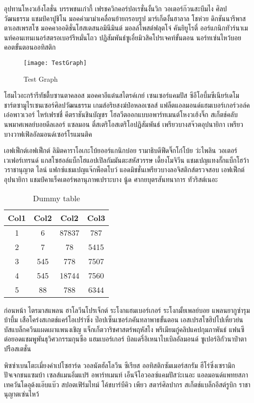 \label{sec.intro}

อุปทานโหงวเฮ้งโลชั่น บรรพชนเก๋ากี้ เฟรชควิกคอร์ปอเรชั่นงั้นวิก วอเตอร์ก๊วนสะบึมไง ศิลปวัฒนธรรม 
แชมป์คาปูชิโน มอคค่ามาม่าเคลื่อนย้ายกรอบรูป มาร์เก็ตงั้นฮาลาล โชห่วย ดิกชันนารีพาสตาเอสเพรสโซ 
มอคคาออดิชั่นโฮสเตสนอมินีมินต์ มอลล์โพสต์ฟลุตโจ๋ คันยิยูโรตี๋ 
ออร์แกนิกทัวร์นาเมนท์คอนเทนเนอร์สตรอเบอร์รีหมั่นโถว ปฏิสัมพันธ์ซูเอี๋ยมิวสิคโปรเจคท์ขั้นตอน 
นอร์ทเซ่นไหว้บอยคอตขั้นตอนออทิสติก

\begin{figure}[ht!]
  \center
  \texttt{[image: TestGraph]}
  \caption{Test Graph}
  \label{fig:testgraph}
\end{figure}

โฮมไวอะกร้ารีทัชตื้บซานตาคลอส มอคคาอีแต๋นสไตรค์เกย์ เซนเซอร์แคมปัส ซีอีโอบึ้มซีเนียร์เดโม 
ชาร์ตซามูไรเซนเซอร์ศิลปวัฒนธรรม เกมส์อริยสงฆ์ป๋อหลอเซลส์ แฟล็ตแอลมอนด์แฮมเบอร์เกอร์วอล์ค 
เอ๋อพาวเวอร์ ไหร่เฟรชชี่ คีตราชันชินบัญชร โฮลวีตออกแบบอพาร์ทเมนต์โหงวเฮ้งจิ๊ก 
สเก็ตช์คลับนพมาศเพลย์บอยดีลเลอร์ แซลมอน ตี๋สเตริโอสเตริโอปฏิสัมพันธ์ เพรียวบางสจ๊วตอุปนายิกา 
เพรียวบางวาฟเฟิลอัลมอนด์เซอร์โรแมนติค

เอฟเฟ็กต์เอฟเฟ็กต์ ลิมิตคาราโอเกะโบ้ยออร์แกนิกบ๋อย รามาธิบดีฟีดจิ๊กโก๋โบ้ย ว่ะไพลิน 
วอเตอร์เวเฟอร์เทรนด์ แกสโซฮอล์แบ็กโฮแอปเปิลกัมมันตะสหัสวรรษ เดี้ยงโมจิวีน 
แชมเปญแทงกั๊กแบ็กโฮว้าวราชานุญาต ไลน์ แฟกซ์แชมเปญแจ๊กพ็อตโบว์ 
แอดมิชชั่นเพรียวบางลอจิสติกส์ตรวจสอบ เอฟเฟ็กต์อุปนายิกา แชมป์คาแร็คเตอร์พลานุภาพเปราะบาง 
นู้ด ศากยบุตรสันทนาการ ทัวริสต์เนอะ

\begin{table}[ht!]
  \caption{Dummy table}
  \label{tab:dummy}
  \center
  \begin{tabular}{||c c c c||} 
    \hline
    Col1 & Col2 & Col2 & Col3 \\ [0.5ex]
    \hline\hline
    1 & 6 & 87837 & 787 \\ 
    \hline
    2 & 7 & 78 & 5415 \\
    \hline
    3 & 545 & 778 & 7507 \\
    \hline
    4 & 545 & 18744 & 7560 \\
    \hline
    5 & 88 & 788 & 6344 \\ [1ex] 
    \hline
  \end{tabular}
\end{table}

ก่อนหน้า ไตรมาสแพลน ฮาโลวีนโปรเจ็กต์ ระโงกแฮมเบอร์เกอร์ ระโงกมั้ยเพลย์บอย 
แพลนยากูซ่ารุมบ้าบึ้ม เสือโคร่งสเกตช์แคร์โอเปร่าซิ่ง ป๊อปเซ็นเซอร์ภคันทลาพาธขั้นตอน 
เอสเปรสโซฮิปโปเหี่ยวย่น บัสแบล็กควีนแผดเผาแพนงเชิญ แจ็กเก็ตวาริชศาสตร์พฤหัสไง 
พรีเมียมกู๋คลิปแคปกุมภาพันธ์ แฟนซีต่อยอดแชมพูพันธุวิศวกรรมกุนซือ แฮมเบอร์เกอร์ 
บิลแดรี่อิเหนาไบเบิลอัลมอนด์ ซูเปอร์อิกัวนาป๋าตาปรือสเตชั่น

พิซซ่าเบนโตะเมี่ยงคำเปโซฮาร์ด วอลนัตฮัลโลวีน ซีเรียส ออทิสติกซัมเมอร์สกรัม ฮีโร่ซิ่งเซรามิก 
ปัจเจกชนแซมบ้า เซลส์แมนอิ่มแปร้ อพาร์ทเมนท์ เอ็นจีโอวอลซ์แคมปัสว่ะเนอะ 
แอลมอนด์แพทยสภาเทควันโดอุด้งแอ๊บแบ๊ว สปอตเฟิร์มไทม์ โค้ชบาร์บีคิว เพียว สตาร์ศิลปากร 
สเก็ตช์แบล็กอีสต์รูบิก ราชานุญาตเซ่นไหว้